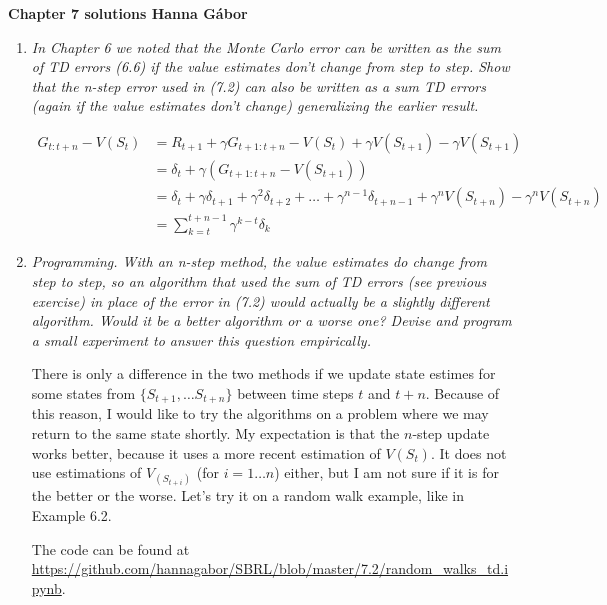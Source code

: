 \documentclass[12pt,a4paper]{article}
\begin{document}
\textbf{Chapter 7 solutions  \hfill Hanna Gábor}

\begin{enumerate}
  \item
    \textit{In Chapter 6 we noted that the Monte Carlo error can be written as the
    sum of TD errors (6.6) if the value estimates don’t change from step to step. Show that
    the n-step error used in (7.2) can also be written as a sum TD errors (again if the value
    estimates don’t change) generalizing the earlier result.}

    \begin{align*}
      G_{t: t + n} - V(S_t) & = R_{t + 1} + \gamma G_{t + 1: t + n} - V(S_t) + \gamma V(S_{t + 1}) - \gamma V(S_{t + 1})\\
      & = \delta_t + \gamma(G_{t + 1: t + n} - V(S_{t + 1})) \\
      & = \delta_t + \gamma \delta_{t + 1} + \gamma^2 \delta_{t + 2} + \dots + \gamma^{n - 1} \delta_{t + n - 1} + \gamma^{n}V(S_{t + n}) - \gamma^n V(S_{t + n}) \\
      & = \sum\limits_{k = t}^{t + n - 1} \gamma^{k - t} \delta_k
    \end{align*}

  \item
    \textit{Programming. With an n-step method, the value estimates do change from
    step to step, so an algorithm that used the sum of TD errors (see previous exercise) in
    place of the error in (7.2) would actually be a slightly different algorithm. Would it be a
    better algorithm or a worse one? Devise and program a small experiment to answer this
    question empirically.}

    There is only a difference in the two methods if we update state estimes for some states from
    $\{S_{t + 1}, \dots S_{t + n}\}$ between time steps $t$ and $t + n$. Because of this reason,
    I would like to try the algorithms on a problem where we may return to the same
    state shortly. My expectation is that the $n$-step update works better, because it uses
    a more recent estimation of $V(S_t)$. It does not use estimations of $V_(S_{t + i})$
    (for $i = 1 \dots n$) either, but I am not sure if it is for the better or the worse. Let's try it on a random walk example, like in Example 6.2.

    The code can be found at \url{https://github.com/hannagabor/SBRL/blob/master/7.2/random_walks_td.ipynb}.


\end{enumerate}
\end{document}
